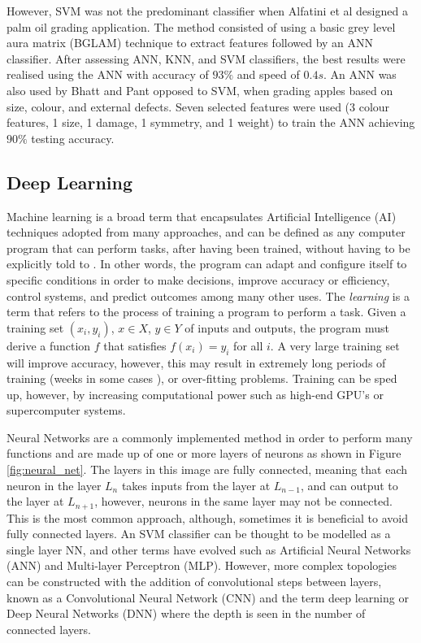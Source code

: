 \documentclass[fleqn,twoside,12pt]{report}
\begin{document}
However, SVM was not the predominant classifier when Alfatini et al \cite{alfatni} designed a palm oil grading application. The method consisted of using a basic grey level aura matrix (BGLAM) technique to extract features followed by an ANN classifier. After assessing ANN, KNN, and SVM classifiers, the best results were realised using the ANN with accuracy of $93\%$ and speed of $0.4s$. An ANN was also used by Bhatt and Pant \cite{bhatt} opposed to SVM, when grading apples based on size, colour, and external defects. Seven selected features were used (3 colour features, 1 size, 1 damage, 1 symmetry, and 1 weight) to train the ANN achieving $90\%$ testing accuracy. 



\subsection{Deep Learning}

Machine learning is a broad term that encapsulates Artificial Intelligence (AI) techniques adopted from many approaches, and can be defined as any  computer program that can perform tasks, after having been trained,  without having to be explicitly told to \cite{langley,shavlik,mohri}. In other words, the program can adapt and configure itself to specific conditions in order to make decisions, improve accuracy or efficiency, control systems, and predict outcomes among many other uses. The \textit{learning} is a term that refers to the process of training a program to perform a task. Given a training set $(x_i, y_i)$, $x\in X$, $y\in Y$ of inputs and outputs, the program must derive a function $f$ that satisfies $f(x_i) = y_i$ for all $i$. A very large training set will improve accuracy, however, this may result in extremely long periods of training (weeks in some cases \cite{bottou}), or over-fitting problems. Training can be sped up, however, by increasing computational power such as high-end GPU's or supercomputer systems.

Neural Networks are a commonly implemented method in order to perform many functions and are made up of one or more layers of neurons as shown in Figure \ref{fig:neural_net}. The layers in this image are fully connected, meaning that each neuron in the layer $L_n$ takes inputs from the layer at $L_{n-1}$, and can output to the layer at $L_{n+1}$, however, neurons in the same layer may not be connected. This is the most common approach, although, sometimes it is beneficial to avoid fully connected layers. An SVM classifier can be thought to be modelled as a single layer NN, and other terms have evolved such as Artificial Neural Networks (ANN) and Multi-layer Perceptron (MLP). However, more complex topologies can be constructed with the addition of convolutional steps between layers, known as a Convolutional Neural Network (CNN) and the term deep learning or Deep Neural Networks (DNN) where the depth is seen in the number of connected layers.  
\end{document}
